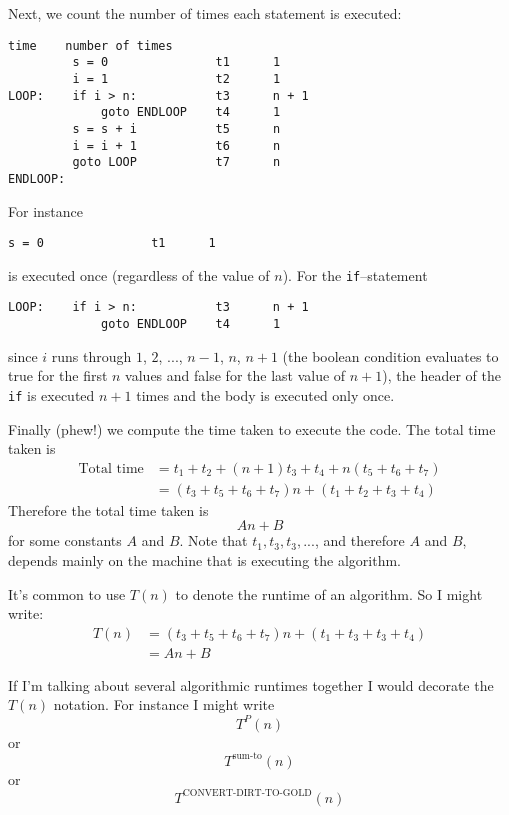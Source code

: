 Next, we count the number of times each statement is executed:
\begin{Verbatim}[frame=single,fontsize=\footnotesize]
                             time    number of times
         s = 0               t1      1
         i = 1               t2      1
LOOP:    if i > n:           t3      n + 1
             goto ENDLOOP    t4      1
         s = s + i           t5      n     
         i = i + 1           t6      n     
         goto LOOP           t7      n
ENDLOOP:
\end{Verbatim}
For instance
\begin{Verbatim}[frame=single,fontsize=\footnotesize]
         s = 0               t1      1
\end{Verbatim}
is executed once (regardless of the value of $n$).
For the \verb!if!--statement
\begin{Verbatim}[frame=single,fontsize=\footnotesize]
LOOP:    if i > n:           t3      n + 1
             goto ENDLOOP    t4      1
\end{Verbatim}
since $i$ runs through 
$1$, $2$, ..., $n - 1$, $n$, $n + 1$
(the boolean condition evaluates to true for the first $n$
values and false for the last value of $n + 1$),
the header of the \verb!if! is executed $n + 1$ times
and the body is executed only once.

Finally (phew!) we compute the time taken to execute the code.
The total time taken is
\begin{align*}
  \text{Total time}
  &= t_1
  + t_2 
  + (n + 1) t_3 
  + t_4
  + n (t_5 + t_6 + t_7)
  \\
  &= (t_3 + t_5 + t_6 + t_7) n
  + (t_1 + t_2 + t_3 + t_4)  
\end{align*}
Therefore the total time taken is 
\[
An + B
\] 
for some constants
$A$ and $B$. 
Note that
$t_1,t_3,t_3, ...$, and therefore $A$ and $B$,
depends mainly on the machine that is executing the algorithm.

It's common to use $T(n)$ to denote the runtime of an algorithm.
So I might write:
\begin{align*}
  T(n)
  &=
  ( t_3 + t_5 + t_6 + t_7 )n
  + (t_1 + t_3 + t_3 + t_4)
  \\
  &= An + B
\end{align*}

If I'm talking about several algorithmic runtimes together
I would decorate the $T(n)$ notation.
For instance I might write
\[
T^P(n)
\]
or
\[
T^{\operatorname{sum-to}}(n)
\]
or
\[
T^{\operatorname{CONVERT-DIRT-TO-GOLD}}(n)
\]

